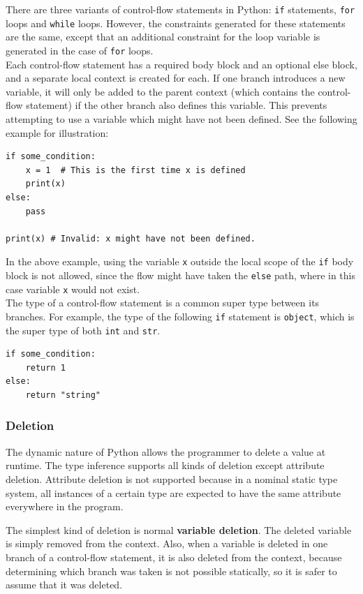 There are three variants of control-flow statements in Python: \lstinline|if| statements, \lstinline|for| loops and \lstinline|while| loops. However, the constraints generated for these statements are the same, except that an additional constraint for the loop variable is generated in the case of \lstinline|for| loops. \\

Each control-flow statement has a required body block and an optional else block, and a separate local context is created for each. If one branch introduces a new variable, it will only be added to the parent context (which contains the control-flow statement) if the other branch also defines this variable. This prevents attempting to use a variable which might have not been defined. See the following example for illustration:

\begin{lstlisting}
if some_condition:
	x = 1  # This is the first time x is defined
	print(x)
else:
	pass
	
print(x) # Invalid: x might have not been defined.
\end{lstlisting}
In the above example, using the variable \lstinline|x| outside the local scope of the \lstinline|if| body block is not allowed, since the flow might have taken the \lstinline|else| path, where in this case variable \lstinline|x| would not exist. \\

The type of a control-flow statement is a common super type between its branches. For example, the type of the following \lstinline|if| statement is \lstinline|object|, which is the super type of both \lstinline|int| and \lstinline|str|.

\begin{lstlisting}
if some_condition:
	return 1
else:
	return "string"
\end{lstlisting}


\subsubsection{Deletion}
The dynamic nature of Python allows the programmer to delete a value at runtime. The type inference supports all kinds of deletion except attribute deletion. Attribute deletion is not supported because in a nominal static type system, all instances of a certain type are expected to have the same attribute everywhere in the program.

The simplest kind of deletion is normal \textbf{variable deletion}. The deleted variable is simply removed from the context. Also, when a variable is deleted in one branch of a control-flow statement, it is also deleted from the context, because determining which branch was taken is not possible statically, so it is safer to assume that it was deleted.

